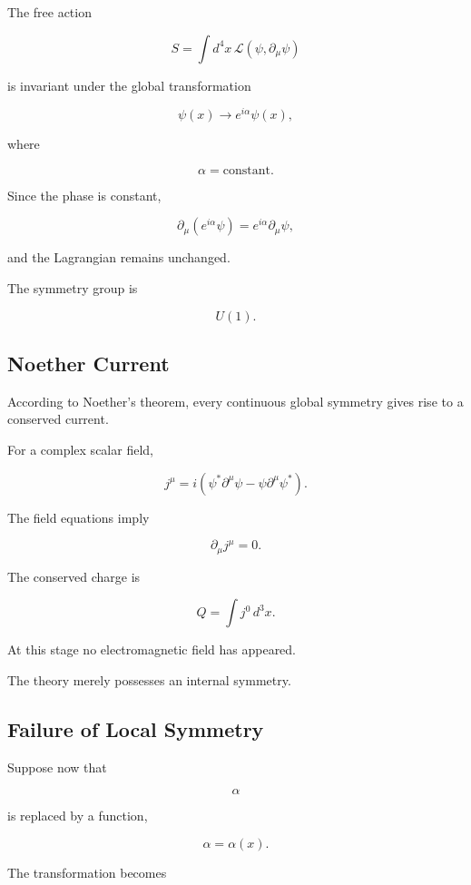 The free action

\[
S
=
\int d^4x\,
\mathcal L(\psi,\partial_\mu\psi)
\]

is invariant under the global transformation

\[
\boxed{
\psi(x)
\rightarrow
e^{i\alpha}\psi(x),
}
\]

where

\[
\alpha
=
\mathrm{constant}.
\]

Since the phase is constant,

\[
\partial_\mu
(e^{i\alpha}\psi)
=
e^{i\alpha}
\partial_\mu\psi,
\]

and the Lagrangian remains unchanged.

The symmetry group is

\[
U(1).
\]


\subsection{Noether Current}

According to Noether's theorem,
every continuous global symmetry gives rise to a conserved current.

For a complex scalar field,

\[
\boxed{
j^\mu
=
i
\left(
\psi^*\partial^\mu\psi
-
\psi\partial^\mu\psi^*
\right).
}
\]

The field equations imply

\[
\boxed{
\partial_\mu j^\mu=0.
}
\]

The conserved charge is

\[
Q
=
\int
j^0\,d^3x.
\]

At this stage no electromagnetic field has appeared.

The theory merely possesses an internal symmetry.


\subsection{Failure of Local Symmetry}

Suppose now that

\[
\alpha
\]

is replaced by a function,

\[
\alpha
=
\alpha(x).
\]

The transformation becomes

